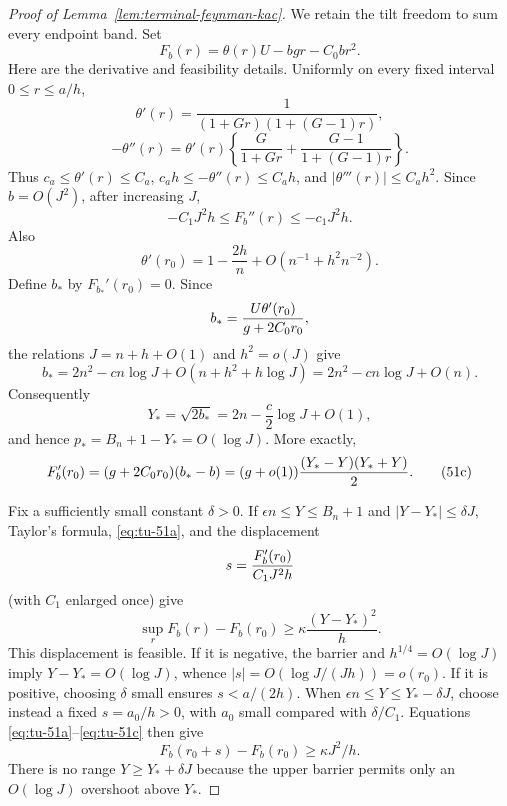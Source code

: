 \begin{proof}[Proof of Lemma~\ref{lem:terminal-feynman-kac}]
We retain the tilt freedom to sum every endpoint band.  Set
\[
       F_b(r)=\theta(r)U-bgr-C_0br^2.
\]
Here are the derivative and feasibility details.  Uniformly on every fixed
interval \(0\le r\le a/h\),
\[
 \theta'(r)=\frac1{(1+Gr)(1+(G-1)r)},
\]
\[
 -\theta''(r)=\theta'(r)
 \left\{\frac G{1+Gr}+\frac{G-1}{1+(G-1)r}\right\}.
\]
Thus \(c_a\le\theta'(r)\le C_a\),
\(c_ah\le-\theta''(r)\le C_ah\), and
\(|\theta'''(r)|\le C_ah^2\).  Since \(b=O(J^2)\), after increasing
\(J\),
\begin{equation}
       -C_1J^2h\le F_b''(r)\le-c_1J^2h.                     \tag{51a}\label{eq:tu-51a}
\end{equation}
Also
\begin{equation}
 \theta'(r_0)=1-\frac{2h}{n}
                  +O(n^{-1}+h^2n^{-2}).                     \tag{51b}\label{eq:tu-51b}
\end{equation}
Define \(b_*\) by \(F_{b_*}'(r_0)=0\).  Since
\[
       b_*={U\theta'(r_0)\over g+2C_0r_0},
\]
the relations \(J=n+h+O(1)\) and \(h^2=o(J)\) give
\[
 b_*=2n^2-cn\log J+O(n+h^2+h\log J)
     =2n^2-cn\log J+O(n).
\]
Consequently
\begin{equation}
       Y_*=\sqrt{2b_*}
          =2n-\frac c2\log J+O(1),                            \tag{51}\label{eq:tu-51-2}
\end{equation}
and hence \(p_*=B_n+1-Y_*=O(\log J)\).  More exactly,
\begin{equation}
 F_b'(r_0)=(g+2C_0r_0)(b_*-b)
          =(g+o(1)){(Y_*-Y)(Y_*+Y)\over2}.                  \tag{51c}\label{eq:tu-51c}
\end{equation}

Fix a sufficiently small constant \(\delta>0\).  If
\(\epsilon n\le Y\le B_n+1\) and \(|Y-Y_*|\le\delta J\), Taylor's
formula, \eqref{eq:tu-51a}, and the displacement
\[
       s={F_b'(r_0)\over C_1J^2h}
\]
(with \(C_1\) enlarged once) give
\begin{equation}
 \sup_rF_b(r)-F_b(r_0)
 \ge\kappa\frac{(Y-Y_*)^2}{h}.                              \tag{51d}\label{eq:tu-51d}
\end{equation}
This displacement is feasible.  If it is negative, the barrier and
\(h^{1/4}=O(\log J)\) imply \(Y-Y_*=O(\log J)\), whence
\(|s|=O(\log J/(Jh))=o(r_0)\).  If it is positive, choosing \(\delta\)
small ensures \(s<a/(2h)\).  When
\(\epsilon n\le Y\le Y_*-\delta J\), choose instead a fixed
\(s=a_0/h>0\), with \(a_0\) small compared with \(\delta/C_1\).
Equations \eqref{eq:tu-51a}--\eqref{eq:tu-51c} then give
\begin{equation}
       F_b(r_0+s)-F_b(r_0)\ge\kappa J^2/h.                  \tag{51e}\label{eq:tu-51e}
\end{equation}
There is no range \(Y\ge Y_*+\delta J\) because the upper barrier permits
only an \(O(\log J)\) overshoot above \(Y_*\).


\end{proof}
